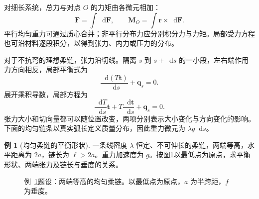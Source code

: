 \documentclass[11pt,openany,fontset=fandol]{ctexbook}
\theoremstyle{definition}\newtheorem{example}{例}[chapter]\newtheorem{exercise}{习题}[chapter]
\newcommand{\dd}{\mathop{}\!\mathrm d}\newcommand{\ee}{\mathrm e}\newcommand{\vct}[1]{\bm{#1}}
\begin{document}
对细长系统，总力与对点 $O$ 的力矩由各微元相加：
\[
\vct F=\int\dd\vct F,\qquad
\vct M_O=\int\vct r\times\dd\vct F.
\]
平行均匀重力可通过质心合并；非平行分布力应分别积分力与力矩。局部受力方程也可沿材料逐段积分，以得到张力、内力或压力的分布。

对于不抗弯的理想柔链，张力沿切线。隔离 $s$ 到 $s+\dd s$ 的一小段，左右端作用力方向相反，局部平衡式为
\[
\frac{\dd(T\vct t)}{\dd s}+\vct q_s=0.
\]
展开乘积导数，局部方程为
\[
\frac{\dd T}{\dd s}\vct t+T\frac{\dd\vct t}{\dd s}+\vct q_s=0.
\]
张力大小和切向量都可以随位置改变，两项分别表示大小变化与方向变化的影响。下面的均匀链条以真实弧长定义质量分布，因此重力微元为 $\lambda g\dd s$。

\par\medskip\noindent\begin{minipage}{\textwidth}
\begin{example}[均匀柔链的平衡形状]\label{mp1:ex:e7}
一条线密度 $\lambda$ 恒定、不可伸长的柔链，两端等高，水平距离为 $2a$，链长为 $\ell>2a$。重力加速度为 $g$。按图\ref{mp1:fig:e7-q}以最低点为原点，求平衡形状、两端张力及链长与垂度的关系。
\end{example}

\begin{figure}[H]\centering

\caption{例~\ref{mp1:ex:e7}题设：两端等高的均匀柔链。以最低点为原点，$a$ 为半跨距，$f$ 为垂度。}\label{mp1:fig:e7-q}
\end{figure}

\end{minipage}\par\medskip
\end{document}
